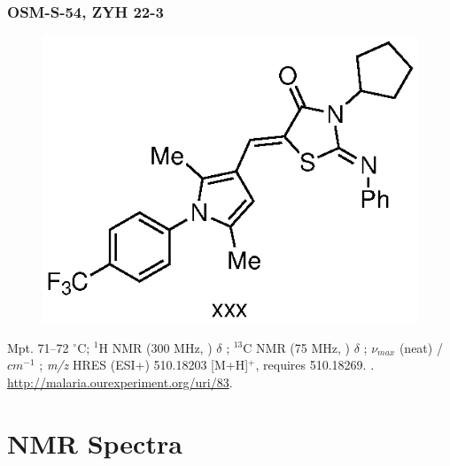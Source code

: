 \documentclass[12pt, a4paper,titlepage]{article}
\begin{document}
{\subsubsection*{OSM-S-54, ZYH 22-3}
\label{exp:ZYH22}
\begin{figure}[H]
	\begin{center}
	\includegraphics{exp/ZYH22.eps}
	\end{center}
	\vspace{-25pt}	
	\end{figure}

Mpt. 71--72 $^\circ$C; 
$^1$H NMR (300 MHz, ) $\delta$ ; 
  $^{13}$C NMR (75 MHz, ) $\delta$ ; 
 $\nu_{max}$ (neat) /$cm^{-1}$ ; 
\emph{m/z} HRES (ESI+) 510.18203 [M+H]$^+$,  requires 510.18269.
. 
\url{http://malaria.ourexperiment.org/uri/83}. 

\section{NMR Spectra}

\newpage

}
\end{document}
